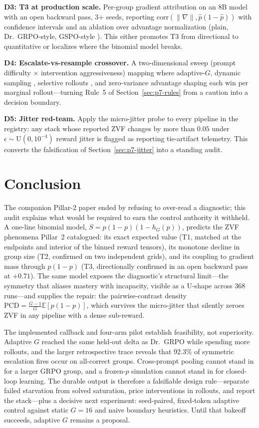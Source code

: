 \documentclass{article}
\providecommand{\eps}{\ensuremath{\epsilon}}
\newcommand{\E}{\mathbb{E}}
\begin{document}
\textbf{D3: T3 at production scale.} Per-group gradient attribution on an
8B model with an open backward pass, 3+ seeds, reporting
$\mathrm{corr}(\|\nabla\|, \hat p(1-\hat p))$ with confidence intervals and
an ablation over advantage normalization (plain, Dr.~GRPO-style, GSPO-style
\citep{qwen2025gspo}). This either promotes T3 from directional to
quantitative or localizes where the binomial model breaks.

\textbf{D4: Escalate-vs-resample crossover.} A two-dimensional sweep
(prompt difficulty $\times$ intervention aggressiveness) mapping where
adaptive-$G$, dynamic sampling \citep{yu2025dapo}, selective rollouts
\citep{zhang2026greso}, and zero-variance advantage shaping
\citep{le2025rlzvp} each win per marginal rollout---turning
Rule~5 of Section~\ref{sec:p7-rules} from a caution into a decision
boundary.

\textbf{D5: Jitter red-team.} Apply the micro-jitter probe to every
pipeline in the registry: any stack whose reported ZVF changes by more than
$0.05$ under $\eps \sim \mathrm{U}(0, 10^{-4})$ reward jitter is flagged as
reporting tie-artifact telemetry. This converts the falsification of
Section~\ref{sec:p7-jitter} into a standing audit.
 \section{Conclusion}
\label{sec:p7-conclusion}
The companion Pillar-2 paper ended by refusing to over-read a diagnostic;
this audit explains what would be required to earn the control authority it
withheld. A one-line binomial model,
$S = p(1-p)(1 - h_G(p))$, predicts the ZVF phenomena Pillar~2 catalogued:
its exact expected value (T1, matched at the endpoints and interior of the
binned reward tensors), its monotone decline in group size (T2, confirmed
on two independent grids), and its coupling to gradient mass through
$p(1-p)$ (T3, directionally confirmed in an open backward pass at
$+0.71$). The same model exposes the diagnostic's structural limit---the
symmetry that aliases mastery with incapacity, visible as a U-shape across
368 runs---and supplies the repair: the pairwise-contrast density
$\mathrm{PCD} = \frac{G-1}{G}\E[p(1-p)]$, which survives the micro-jitter
that silently zeroes ZVF in any pipeline with a dense sub-reward.

The implemented callback and four-arm pilot establish feasibility, not
superiority. Adaptive $G$ reached the same held-out delta as Dr.~GRPO while
spending more rollouts, and the larger retrospective trace reveals that 92.3\%
of symmetric escalation fires occur on all-correct groups. Cross-prompt pooling
cannot stand in for a larger GRPO group, and a frozen-$p$ simulation cannot stand
in for closed-loop learning. The durable output is therefore a falsifiable design
rule---separate failed starvation from solved saturation, price interventions in
rollouts, and report the stack---plus a decisive next experiment: seed-paired,
fixed-token adaptive control against static $G{=}16$ and naive boundary
heuristics. Until that bakeoff succeeds, adaptive $G$ remains a proposal.
 \appendix
\end{document}
